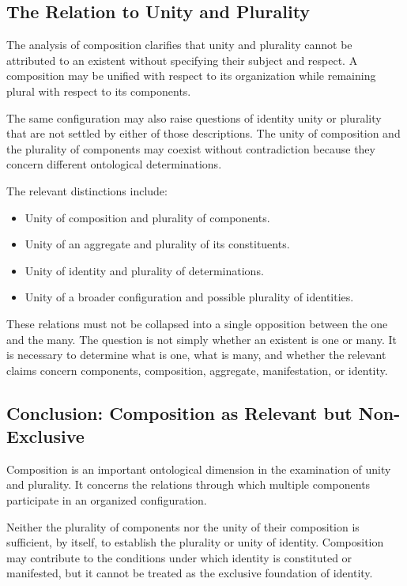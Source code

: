 \subsection{The Relation to Unity and Plurality}

The analysis of composition clarifies that unity and
plurality cannot be attributed to an existent without
specifying their subject and respect. A composition
may be unified with respect to its organization while
remaining plural with respect to its components.

The same configuration may also raise questions of
identity unity or plurality that are not settled by
either of those descriptions. The unity of composition
and the plurality of components may coexist without
contradiction because they concern different
ontological determinations.

The relevant distinctions include:

\begin{itemize}
    \item Unity of composition and plurality of components.
    \item Unity of an aggregate and plurality of its constituents.
    \item Unity of identity and plurality of determinations.
    \item Unity of a broader configuration and possible
    plurality of identities.
\end{itemize}

These relations must not be collapsed into a single
opposition between the one and the many. The question
is not simply whether an existent is one or many. It
is necessary to determine what is one, what is many,
and whether the relevant claims concern components,
composition, aggregate, manifestation, or identity.

\subsection{Conclusion: Composition as Relevant but Non-Exclusive}

Composition is an important ontological dimension
in the examination of unity and plurality. It concerns
the relations through which multiple components
participate in an organized configuration.

Neither the plurality of components nor the unity
of their composition is sufficient, by itself, to
establish the plurality or unity of identity. Composition
may contribute to the conditions under which identity
is constituted or manifested, but it cannot be treated
as the exclusive foundation of identity.

